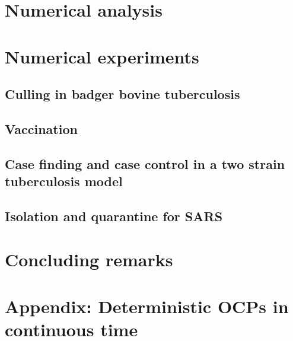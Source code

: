 \documentclass[]{amsart}
\begin{document}
  \section{Numerical analysis}
    
    
  \section{Numerical experiments}
    \subsection{Culling in badger bovine tuberculosis}
      
    \subsection{Vaccination}
      
    \subsection{Case finding and case control 
      in a two strain tuberculosis model}
      
    \subsection{Isolation and quarantine for SARS} 
      
%
%
  \section{Concluding remarks}
   
  \section{Appendix: Deterministic OCPs in continuous time}
    
%
%
  
  
\end{document}
